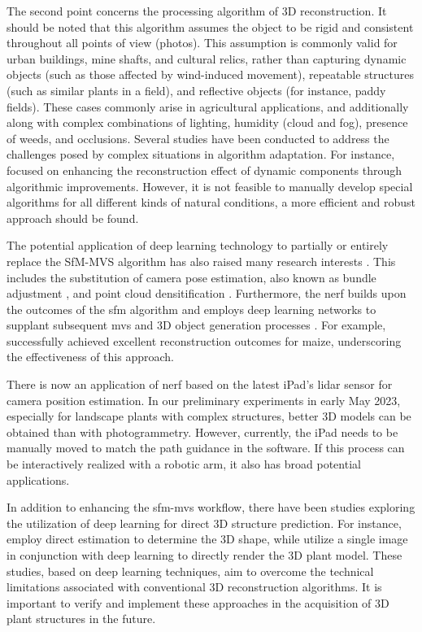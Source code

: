  The second point concerns the processing algorithm of 3D reconstruction.
  It should be noted that this algorithm assumes the object to be rigid and consistent throughout all points of view (photos). 
  This assumption is commonly valid for urban buildings, mine shafts, and cultural relics,
  rather than capturing dynamic objects (such as those affected by wind-induced movement), 
  repeatable structures (such as similar plants in a field), 
  and reflective objects (for instance, paddy fields). 
  These cases commonly arise in agricultural applications, and additionally along with complex combinations of lighting, humidity (cloud and fog),  presence of weeds, and occlusions.
  Several studies have been conducted to address the challenges posed by complex situations in algorithm adaptation. 
  For instance, \mbox{\citet{zheng_sparse_2015}} focused on enhancing the reconstruction effect of dynamic components through algorithmic improvements. 
  However, it is not feasible to manually develop special algorithms for all different kinds of natural conditions, a more efficient and robust approach should be found.



  The potential application of deep learning technology to partially or entirely replace the SfM-MVS algorithm has also raised many research interests \mbox{\citep{li_dl-based_2022}}. 
  This includes the substitution of camera pose estimation, also known as bundle adjustment \mbox{\citep{vedaldi_deepsfm_2020}}, and point cloud densitification \mbox{\citep{ferrari_mvsnet_2018}}. Furthermore, the \gls{nerf} builds upon the outcomes of the \gls{sfm} algorithm and employs deep learning networks to supplant subsequent \gls{mvs} and 3D object generation processes \mbox{\citep{mildenhall_nerf_2022}}. For example, \mbox{\citet{jignasu_plant_2023}} successfully achieved excellent reconstruction outcomes for maize, underscoring the effectiveness of this approach.

 There is now an application of \gls{nerf} based on the latest iPad's \gls{lidar} sensor for camera position estimation. In our preliminary experiments in early May 2023, especially for landscape plants with complex structures, better 3D models can be obtained than with photogrammetry. However, currently, the iPad needs to be manually moved to match the path guidance in the software. If this process can be interactively realized with a robotic arm, it also has broad potential applications.


  In addition to enhancing the \gls{sfm}-\gls{mvs} workflow, there have been studies exploring the utilization of deep learning for direct 3D structure prediction. 
  For instance, \mbox{\citet{vicini_differentiable_2022}} employ direct estimation to determine the 3D shape, while \mbox{\citet{magistri_towards_2021}} utilize a single image in conjunction with deep learning to directly render the 3D plant model. 
  These studies, based on deep learning techniques, aim to overcome the technical limitations associated with conventional 3D reconstruction algorithms. 
  It is important to verify and implement these approaches in the acquisition of 3D plant structures in the future.



